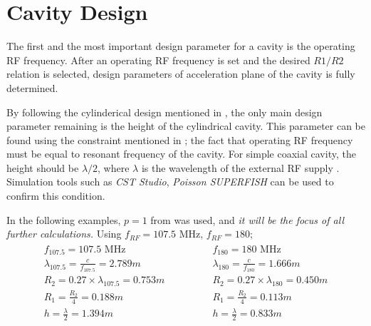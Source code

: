 \documentclass[a4paper,oneside,12pt]{report}
\numberwithin{equation}{chapter}
\begin{document}
\section{Cavity Design} \label{sec:cavity_design}

The first and the most important design parameter for a cavity is the operating RF frequency.
After an operating RF frequency is set and the desired $R1/R2$ relation  is selected, design parameters of acceleration plane of the cavity is fully determined.

By following the cylinderical design mentioned in , the only main design parameter remaining is the height of the cylindrical cavity.
This parameter can be found using the constraint mentioned in ; the fact that operating RF frequency must be equal to resonant frequency of the cavity.
For simple coaxial cavity, the height should be $\lambda/2$, where $\lambda$ is the wavelength of the external RF supply \cite{rhodo_pottier}.
Simulation tools such as \textit{CST Studio}, \textit{Poisson SUPERFISH} can be used to confirm this condition.

In the following examples, $p=1$ from  was used, and \textit{it will be the focus of all further calculations.}
Using $f_{RF}=107.5$ MHz, $f_{RF}=180$;
\begin{eqnarray} \label{eq:107_180_MHZ_cavity_design_parameters}
    \begin{aligned}
        f_{107.5} = 107.5 \textrm{ MHz} \\
        \lambda_{107.5}  = \frac{c}{f_{107.5}} = 2.789 m \\
        R_2 = 0.27 \times \lambda_{107.5} = 0.753 m \\
        R_1 = \frac{R_2}{4} = 0.188 m \\
        h = \frac{\lambda}{2} = 1.394 m 
    \end{aligned}
    \qquad\qquad
    \begin{aligned}
        f_{180} = 180 \textrm{ MHz} \\
        \lambda_{180}  = \frac{c}{f_{180}} = 1.666 m \\
        R_2 = 0.27 \times\lambda_{180} = 0.450 m \\
        R_1 = \frac{R_2}{4} = 0.113 m \\
        h = \frac{\lambda}{2} = 0.833 m 
    \end{aligned}
\end{eqnarray}
\end{document}
